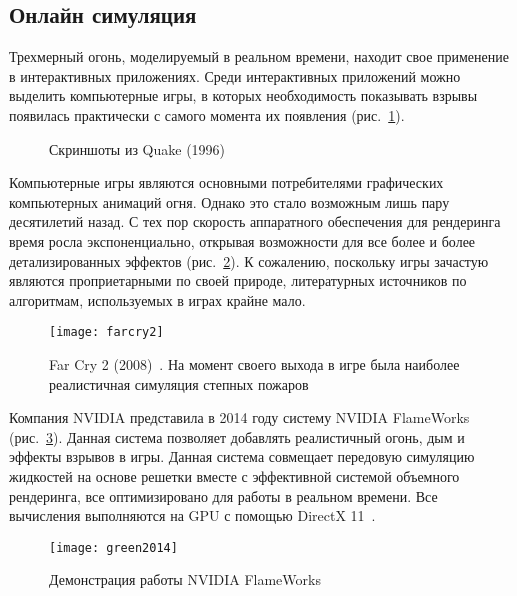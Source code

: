 \subsection{Онлайн симуляция}
Трехмерный огонь, моделируемый в реальном времени, находит свое применение в
интерактивных приложениях. Среди интерактивных приложений можно выделить
компьютерные игры, в которых необходимость показывать взрывы появилась
практически с самого момента их появления (рис.~\ref{fig:earlyGames}).
\begin{figure}
    \centering
    \qquad
    \caption{Скриншоты из Quake (1996)~\cite{capstone}}%
    \label{fig:earlyGames}%
\end{figure}
Компьютерные игры являются основными потребителями графических компьютерных
анимаций огня. Однако это стало возможным лишь пару десятилетий назад. С тех пор
скорость аппаратного обеспечения для рендеринга время росла экспоненциально,
открывая возможности для все более и более детализированных эффектов
(рис.~\ref{fig:farcry2}). К сожалению, поскольку игры зачастую являются
проприетарными по своей природе, литературных источников по алгоритмам,
используемых в играх крайне мало.
\begin{figure}[htb]
	\centering
	\texttt{[image: farcry2]}
	\caption{Far Cry 2 (2008)~\cite{farcry2}. На момент своего выхода в игре
	была наиболее реалистичная симуляция степных пожаров}%
    \label{fig:farcry2}
\end{figure}

Компания NVIDIA представила в 2014 году систему NVIDIA FlameWorks
(рис.~\ref{fig:FlameWorks}). Данная система позволяет добавлять реалистичный
огонь, дым и эффекты взрывов в игры.  Данная система совмещает передовую
симуляцию жидкостей на основе решетки вместе с эффективной системой объемного
рендеринга, все оптимизировано для работы в реальном времени. Все вычисления
выполняются на GPU с помощью DirectX 11~\cite{Green:2014:NFR:2633956.2658828}.
\begin{figure}[htb]
	\centering
	\texttt{[image: green2014]}
	\caption{Демонстрация работы NVIDIA FlameWorks}%
    \label{fig:FlameWorks}
\end{figure}

